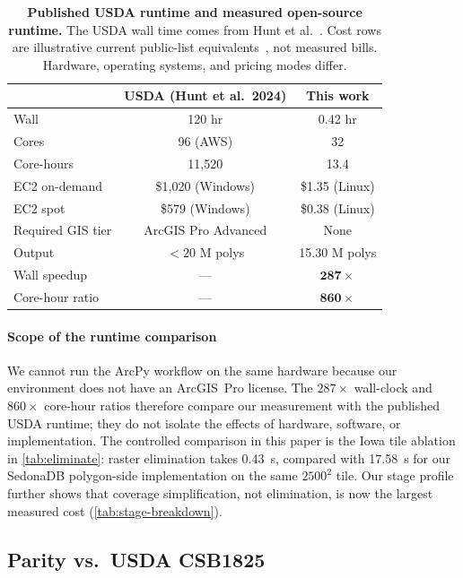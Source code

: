 \documentclass[preprint,12pt]{elsarticle}
\begin{document}
\begin{table}[t]
\centering
\caption{\textbf{Published USDA runtime and measured open-source runtime.}
The USDA wall time comes from Hunt et al.~\cite{hunt2024csb}. Cost rows are
illustrative current public-list
equivalents~\cite{aws_ec2_pricing,aws_spot_pricing}, not
measured bills. Hardware, operating systems, and pricing modes differ.}
\label{tab:cost}
\small
\begin{tabular}{lcc}
\toprule
              & USDA (Hunt et al.\ 2024) & This work \\
\midrule
Wall          & 120 hr                   & 0.42 hr \\
Cores         & 96 (AWS)                 & 32 \\
Core-hours    & 11{,}520                 & 13.4 \\
EC2 on-demand & \$1{,}020 (Windows)       & \$1.35 (Linux) \\
EC2 spot      & \$579 (Windows)           & \$0.38 (Linux) \\
Required GIS tier & ArcGIS Pro Advanced   & None \\
Output        & $<$20 M polys            & 15.30 M polys \\
Wall speedup  & ---                      & $\mathbf{287\times}$ \\
Core-hour ratio & ---                    & $\mathbf{860\times}$ \\
\bottomrule
\end{tabular}
\end{table}

\paragraph{Scope of the runtime comparison}
We cannot run the ArcPy workflow on the same hardware because our environment
does not have an ArcGIS~Pro license. The $287\times$ wall-clock and
$860\times$ core-hour ratios therefore compare our measurement with the
published USDA runtime; they do not isolate the effects of hardware,
software, or implementation. The controlled comparison in this paper is the
Iowa tile ablation in \cref{tab:eliminate}: raster elimination takes
0.43~s, compared with 17.58~s for our SedonaDB polygon-side implementation on
the same $2500^2$ tile. Our stage profile further shows that coverage
simplification, not elimination, is now the largest measured cost
(\cref{tab:stage-breakdown}).

\subsection{Parity vs.\ USDA CSB1825}
\label{sec:results-parity}
\end{document}
